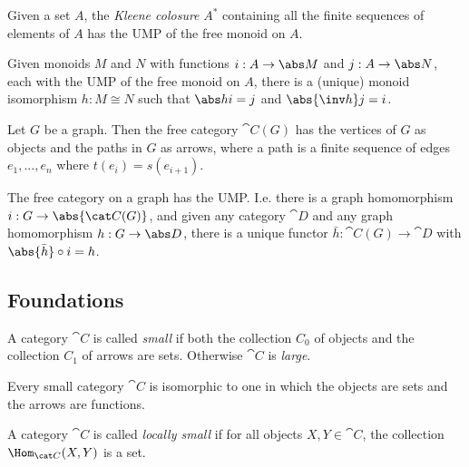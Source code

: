 \documentclass{article}
\begin{document}
\begin{proposition}[Awodey 1.9]
    Given a set $A$, the \emph{Kleene colosure} $A^*$ containing
    all the finite sequences of elements of $A$ has the UMP of the
    free monoid on $A$.
\end{proposition}

\begin{proposition}
    Given monoids $M$ and $N$ with functions $i:A\to\abs M$ and
    $j:A\to\abs N$, each with the UMP of the free monoid on $A$,
    there is a (unique) monoid isomorphism $h:M\cong N$ such that
    $\abs h i=j$ and $\abs{\inv h}j = i$.
\end{proposition}

\begin{definition}
    Let $G$ be a graph. Then the free category $\cat C(G)$ has the vertices
    of $G$ as objects and the paths in $G$ as arrows, where a path is a finite
    sequence of edges $e_1,...,e_n$ where $t(e_i)=s(e_{i+1})$.
\end{definition}

\begin{definition}
    The free category on a graph has the UMP. I.e. there is a graph
    homomorphism $i:G\to\abs{\cat C(G)}$, and given any category $\cat D$
    and any graph homomorphism $h:G\to\abs D$, there is a unique functor
    $\bar h:\cat C(G)\to \cat D$ with $\abs{\bar h}\circ i = h$.
\end{definition}

\subsection{Foundations}

\begin{definition}[Awodey 1.11]
    A category $\cat C$ is called \emph{small} if both the collection $C_0$
    of objects and the collection $C_1$ of arrows are sets. Otherwise $\cat C$
    is \emph{large}.
\end{definition}

\begin{theorem}[Awodey 1.6]
    Every small category $\cat{C}$ is isomorphic
    to one in which the objects are sets and the arrows are functions.
\end{theorem}

\begin{definition}[Awodey 1.12]
    A category $\cat C$ is called \emph{locally small} if for all objects
    $X,Y\in\cat C$, the collection $\Hom_{\cat C}(X,Y)$ is a set.
\end{definition}
\end{document}
